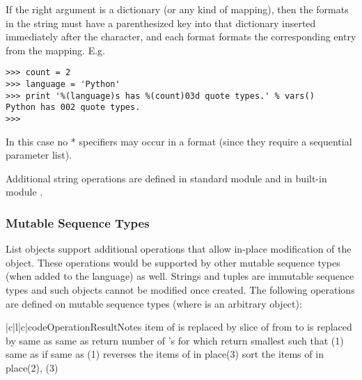 If the right argument is a dictionary (or any kind of mapping), then
the formats in the string must have a parenthesized key into that
dictionary inserted immediately after the \code{\%} character, and
each format formats the corresponding entry from the mapping.  E.g.
\bcode\begin{verbatim}
>>> count = 2
>>> language = 'Python'
>>> print '%(language)s has %(count)03d quote types.' % vars()
Python has 002 quote types.
>>> 
\end{verbatim}\ecode
In this case no * specifiers may occur in a format (since they
require a sequential parameter list).

Additional string operations are defined in standard module
 and in built-in module .

\subsubsection{Mutable Sequence Types}

List objects support additional operations that allow in-place
modification of the object.
These operations would be supported by other mutable sequence types
(when added to the language) as well.
Strings and tuples are immutable sequence types and such objects cannot
be modified once created.
The following operations are defined on mutable sequence types (where
 is an arbitrary object):

\begin{tableiii}{|c|l|c|}{code}{Operation}{Result}{Notes}
	{item  of  is replaced by }{}
  	{slice of  from  to  is replaced by }{}
	{same as }{}
	{same as }{}
	{return number of 's for which }{}
	{return smallest  such that }{(1)}
	{same as 
	  if }{}
	{same as }{(1)}
	{reverses the items of  in place}{(3)}
	{sort the items of  in place}{(2), (3)}
\end{tableiii}
\renewcommand{\indexsubitem}{(list method)}

